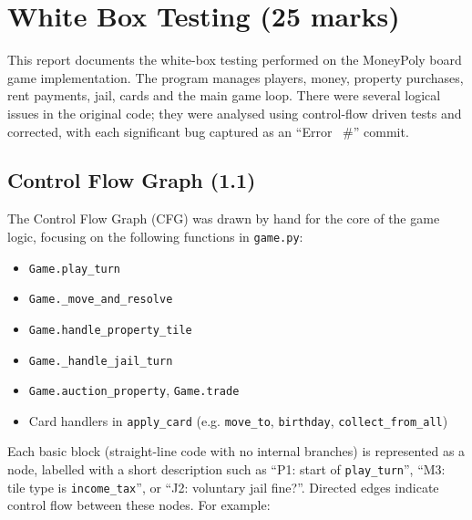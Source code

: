 \documentclass[11pt]{article}
\begin{document}
\section{White Box Testing (25 marks)}

This report documents the white-box testing performed on the MoneyPoly board game implementation. The program manages players, money, property purchases, rent payments, jail, cards and the main game loop. There were several logical issues in the original code; they were analysed using control-flow driven tests and corrected, with each significant bug captured as an ``Error~
#'' commit.

\subsection{Control Flow Graph (1.1)}

The Control Flow Graph (CFG) was drawn by hand for the core of the game logic, focusing on the following functions in \texttt{game.py}:

\begin{itemize}
  \item \texttt{Game.play\_turn}
  \item \texttt{Game.\_move\_and\_resolve}
  \item \texttt{Game.handle\_property\_tile}
  \item \texttt{Game.\_handle\_jail\_turn}
  \item \texttt{Game.auction\_property}, \texttt{Game.trade}
  \item Card handlers in \texttt{apply\_card} (e.g. \texttt{move\_to}, \texttt{birthday}, \texttt{collect\_from\_all})

\end{itemize}

Each basic block (straight-line code with no internal branches) is represented as a node, labelled with a short description such as ``P1: start of \texttt{play\_turn}'', ``M3: tile type is \texttt{income\_tax}'', or ``J2: voluntary jail fine?''. Directed edges indicate control flow between these nodes. For example:
\end{document}
